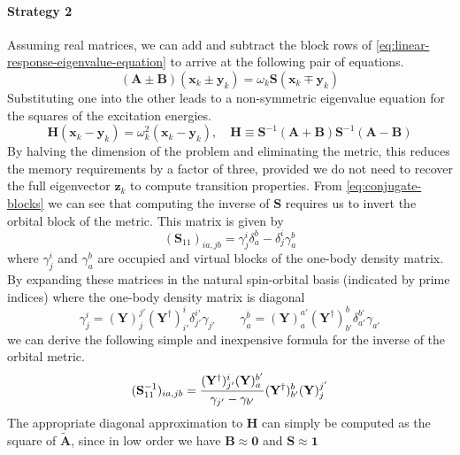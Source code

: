 \paragraph{Strategy 2}
Assuming real matrices, we can add and subtract the block rows of
\cref{eq:linear-response-eigenvalue-equation} to arrive at the following pair of
equations.
\begin{equation}
    (\mathbf{A} \pm \mathbf{B})
    (\mathbf{x}_k  \pm \mathbf{y}_k)
    =
    \omega_k
    \mathbf{S}
    (\mathbf{x}_k \mp \mathbf{y}_k)
\end{equation}
Substituting one into the other leads to a non-symmetric eigenvalue equation for
the squares of the excitation energies.
\begin{equation}
    \mathbf{H}
    (\mathbf{x}_k - \mathbf{y}_k)
    =
    \omega_k^2
    (\mathbf{x}_k - \mathbf{y}_k)
    ,
    \quad
    \mathbf{H}
    \equiv
    \mathbf{S}^{-1}
    (\mathbf{A} + \mathbf{B})
    \mathbf{S}^{-1}
    (\mathbf{A} - \mathbf{B})
\end{equation}
By halving the dimension of the problem and eliminating the metric, this reduces
the memory requirements by a factor of three, provided we do not need to recover
the full eigenvector \(\mathbf{z}_k\) to compute transition properties.
From \cref{eq:conjugate-blocks} we can see that computing the inverse of
\(\mathbf{S}\) requires us to invert the orbital block of the metric.
This matrix is given by
\begin{equation}
    (\mathbf{S}_{11})_{ia,jb}
    =
    \gamma^i_j
    \delta_a^b
    -
    \delta_j^i
    \gamma^b_a
\end{equation}
where
\(
    \gamma_j^i
\)
and
\(
    \gamma_a^b
\)
are occupied and virtual blocks of the one-body density matrix.
By expanding these matrices in the natural spin-orbital basis (indicated by
prime indices) where the one-body density matrix is diagonal
\begin{equation}
    \gamma_j^i
    =
    (\mathbf{Y})_j^{j'}
    (\mathbf{Y}^\dagger)_{i'}^i
    \delta_{j'}^{i'}
    \gamma_{j'}
    \qquad
    \gamma_a^b
    =
    (\mathbf{Y})_a^{a'}
    (\mathbf{Y}^\dagger)_{b'}^b
    \delta_{a'}^{b'}
    \gamma_{a'}
\end{equation}
we can derive the following simple and inexpensive formula for the inverse of
the orbital metric.
\begin{equation}
    (\mathbf{S}_{11}^{-1})_{ia,jb}
    =
    \frac{%
        (\mathbf{Y}^\dagger)_{j'}^i
        (\mathbf{Y})_a^{b'}
    }{%
        \gamma_{j'}-\gamma_{b'}
    }
    (\mathbf{Y}^\dagger)_{b'}^b
    (\mathbf{Y})_j^{j'}
\end{equation}
The appropriate diagonal approximation to \(\mathbf{H}\) can simply be computed
as the square of \(\tilde{\mathbf{A}}\), since in low order we have
\(\mathbf{B}\approx\mathbf{0}\) and \(\mathbf{S}\approx\mathbf{1}\)


